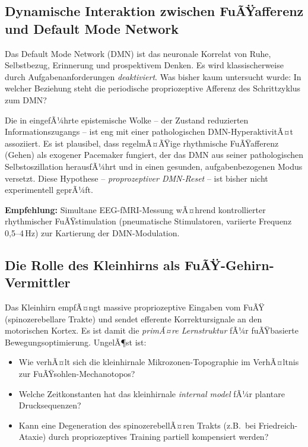 ﻿\documentclass[12pt,a4paper]{report}
\theoremstyle{plain}
\theoremstyle{definition}
\theoremstyle{remark}
\begin{document}
\subsection{Dynamische Interaktion zwischen FuÃŸafferenz und Default Mode Network}

Das Default Mode Network (DMN) ist das neuronale Korrelat von
Ruhe, Selbstbezug, Erinnerung und prospektivem Denken. Es wird
klassischerweise durch Aufgabenanforderungen \emph{deaktiviert}.
Was bisher kaum untersucht wurde: In welcher Beziehung steht die
periodische propriozeptive Afferenz des Schrittzyklus zum DMN?

Die in \cite{epp2026brn} eingefÃ¼hrte epistemische Wolke -- der
Zustand reduzierten Informationszugangs -- ist eng mit einer
pathologischen DMN-HyperaktivitÃ¤t assoziiert. Es ist plausibel,
dass regelmÃ¤ÃŸige rhythmische FuÃŸafferenz (Gehen) als exogener
Pacemaker fungiert, der das DMN aus seiner pathologischen
Selbstoszillation herausfÃ¼hrt und in einen gesunden, aufgabenbezogenen
Modus versetzt. Diese Hypothese -- \emph{proprozeptiver DMN-Reset} --
ist bisher nicht experimentell geprÃ¼ft.

\textbf{Empfehlung:} Simultane EEG-fMRI-Messung wÃ¤hrend
kontrollierter rhythmischer FuÃŸstimulation (pneumatische Stimulatoren,
variierte Frequenz 0{,}5--4\,Hz) zur Kartierung der DMN-Modulation.

\subsection{Die Rolle des Kleinhirns als FuÃŸ-Gehirn-Vermittler}

Das Kleinhirn empfÃ¤ngt massive propriozeptive Eingaben vom FuÃŸ
(spinozerebellare Trakte) und sendet efferente Korrektursignale an
den motorischen Kortex. Es ist damit die \emph{primÃ¤re Lernstruktur}
fÃ¼r fuÃŸbasierte Bewegungsoptimierung. UngelÃ¶st ist:

\begin{itemize}
\item Wie verhÃ¤lt sich die kleinhirnale Mikrozonen-Topographie im
  VerhÃ¤ltnis zur FuÃŸsohlen-Mechanotopos?
\item Welche Zeitkonstanten hat das kleinhirnale \emph{internal model}
  fÃ¼r plantare Drucksequenzen?
\item Kann eine Degeneration des spinozerebellÃ¤ren Trakts (z.B.\ bei
  Friedreich-Ataxie) durch propriozeptives Training partiell kompensiert
  werden?
\end{itemize}
\end{document}
